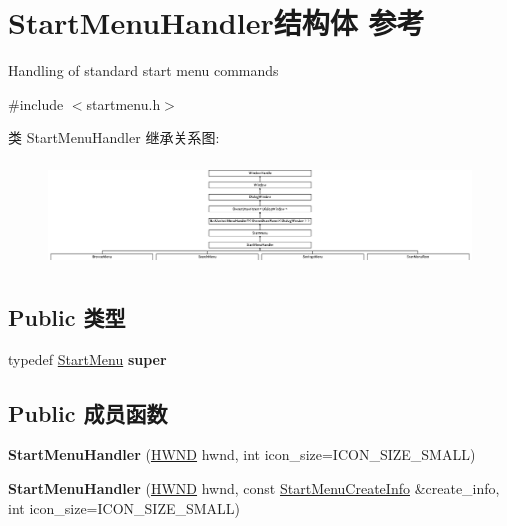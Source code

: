 \hypertarget{struct_start_menu_handler}{}\section{Start\+Menu\+Handler结构体 参考}
\label{struct_start_menu_handler}


Handling of standard start menu commands  




{\ttfamily \#include $<$startmenu.\+h$>$}

类 Start\+Menu\+Handler 继承关系图\+:\begin{figure}[H]
\begin{center}
\leavevmode
\includegraphics[height=2.828283cm]{struct_start_menu_handler}
\end{center}
\end{figure}
\subsection*{Public 类型}
\begin{DoxyCompactItemize}
\item 
\mbox{\label{struct_start_menu_handler_a0e2d4e47d320c1c4c1f84c6efa23f34b}} 
typedef \hyperlink{struct_start_menu}{Start\+Menu} {\bfseries super}
\end{DoxyCompactItemize}
\subsection*{Public 成员函数}
\begin{DoxyCompactItemize}
\item 
\mbox{\label{struct_start_menu_handler_a4e989e141e502bc0e8f12f0c7d402d49}} 
{\bfseries Start\+Menu\+Handler} (\hyperlink{interfacevoid}{H\+W\+ND} hwnd, int icon\+\_\+size=I\+C\+O\+N\+\_\+\+S\+I\+Z\+E\+\_\+\+S\+M\+A\+LL)
\item 
\mbox{\label{struct_start_menu_handler_a97c171eabe12317a9c3154f560540d18}} 
{\bfseries Start\+Menu\+Handler} (\hyperlink{interfacevoid}{H\+W\+ND} hwnd, const \hyperlink{struct_start_menu_create_info}{Start\+Menu\+Create\+Info} \&create\+\_\+info, int icon\+\_\+size=I\+C\+O\+N\+\_\+\+S\+I\+Z\+E\+\_\+\+S\+M\+A\+LL)
\end{DoxyCompactItemize}
